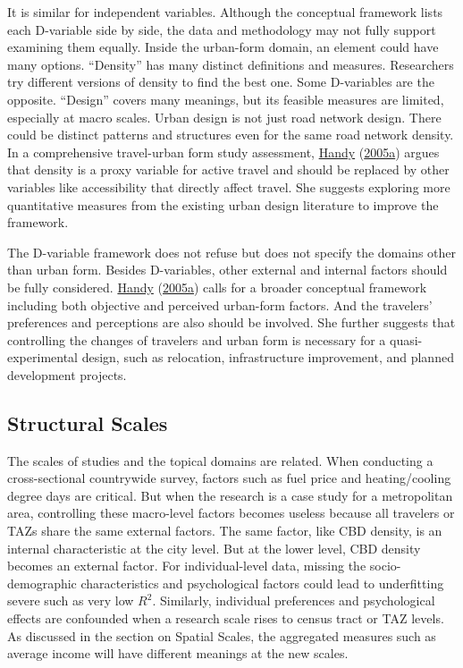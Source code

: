 \documentclass[
  12pt,
]{article}
\begin{document}
It is similar for independent variables. Although the conceptual framework lists each D-variable side by side, the data and methodology may not fully support examining them equally. Inside the urban-form domain, an element could have many options. ``Density'' has many distinct definitions and measures. Researchers try different versions of density to find the best one. Some D-variables are the opposite. ``Design'' covers many meanings, but its feasible measures are limited, especially at macro scales. Urban design is not just road network design. There could be distinct patterns and structures even for the same road network density. In a comprehensive travel-urban form study assessment, \protect\hyperlink{ref-handyCriticalAssessmentLiterature2005}{Handy} (\protect\hyperlink{ref-handyCriticalAssessmentLiterature2005}{2005a}) argues that density is a proxy variable for active travel and should be replaced by other variables like accessibility that directly affect travel. She suggests exploring more quantitative measures from the existing urban design literature to improve the framework.

The D-variable framework does not refuse but does not specify the domains other than urban form. Besides D-variables, other external and internal factors should be fully considered. \protect\hyperlink{ref-handyCriticalAssessmentLiterature2005}{Handy} (\protect\hyperlink{ref-handyCriticalAssessmentLiterature2005}{2005a}) calls for a broader conceptual framework including both objective and perceived urban-form factors. And the travelers' preferences and perceptions are also should be involved. She further suggests that controlling the changes of travelers and urban form is necessary for a quasi-experimental design, such as relocation, infrastructure improvement, and planned development projects.

\hypertarget{structural-scales}{%
\subsection{Structural Scales}\label{structural-scales}}

The scales of studies and the topical domains are related. When conducting a cross-sectional countrywide survey, factors such as fuel price and heating/cooling degree days are critical. But when the research is a case study for a metropolitan area, controlling these macro-level factors becomes useless because all travelers or TAZs share the same external factors. The same factor, like CBD density, is an internal characteristic at the city level. But at the lower level, CBD density becomes an external factor. For individual-level data, missing the socio-demographic characteristics and psychological factors could lead to underfitting severe such as very low \(R^2\). Similarly, individual preferences and psychological effects are confounded when a research scale rises to census tract or TAZ levels. As discussed in the section on Spatial Scales, the aggregated measures such as average income will have different meanings at the new scales.
\end{document}
